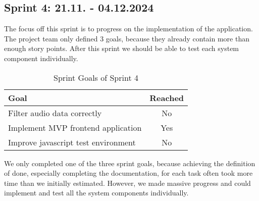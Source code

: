 \subsection{Sprint 4: 21.11. - 04.12.2024}\label{subsec:sprint-4}
The focus off this sprint is to progress on the implementation of the application.
The project team only defined 3 goals, because they already contain more than enough story points.
After this sprint we should be able to test each system component individually.
\begin{table}[H]
    \centering
    \begin{tabularx}{\textwidth}{X c}
        \toprule
        \textbf{Goal}                                         & \textbf{Reached} \\
        \midrule
        Filter audio data correctly                           & No               \\
        \midrule
        Implement MVP frontend application                    & Yes              \\
        \midrule
        Improve javascript test environment                   & No               \\
        \bottomrule
    \end{tabularx}
    \caption{Sprint Goals of Sprint 4}\label{tab:sprint_goals4}
\end{table}
We only completed one of the three sprint goals, because achieving the definition of done, especially completing the documentation,
for each task often took more time than we initially estimated.
However, we made massive progress and could implement and test all the system components individually.

